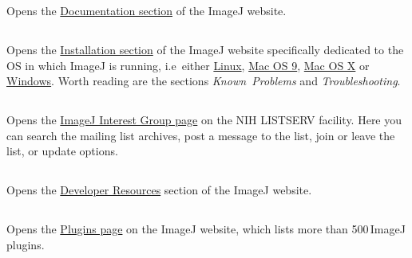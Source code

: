 Opens the \href{http://imagej.nih.gov/ij/docs/}{Documentation section}
of the ImageJ website.


\subsection{\protect{}\label{sub:Installation...}}

Opens the \href{http://imagej.nih.gov/ij/docs/install/}{Installation section}
of the ImageJ website specifically dedicated to the OS in which ImageJ
is running, i.e~either \href{http://imagej.nih.gov/ij/docs/install/linux.html}{Linux},
\href{http://imagej.nih.gov/ij/docs/install/mac.html}{Mac OS 9},
\href{http://imagej.nih.gov/ij/docs/install/osx.html}{Mac OS X} or
\href{http://imagej.nih.gov/ij/docs/install/windows.html}{Windows}.
Worth reading are the sections \emph{Known~Problems} and \emph{Troubleshooting}.


\subsection[\protect\userinterface{Mailing List\ldots{}}]{\protect{}\label{sub:List-Archives...}}

Opens the \href{https://list.nih.gov/archives/imagej.html}{ImageJ Interest Group page}
on the NIH LISTSERV facility. Here you can search the mailing list
archives, post a message to the list, join or leave the list, or update
options.


\subsection{\protect{}\label{sub:Help-Dev.Resources...}}

Opens the \href{http://imagej.nih.gov/ij/developer/index.html}{Developer Resources}
section of the ImageJ website. 


\subsection{\protect{}\label{sub:Plugins...}}

Opens the \href{http://imagej.nih.gov/ij/plugins/}{Plugins page}
on the ImageJ website, which lists more than 500\,ImageJ plugins. 


\subsection{\protect{}}

